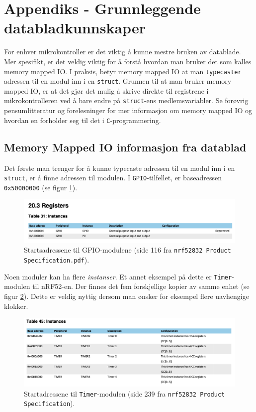 \appendix


\section{Appendiks - Grunnleggende databladkunnskaper}\label{app:datablad}

For enhver mikrokontroller er det viktig å kunne mestre bruken av datablade. Mer spesifikt, er det veldig viktig for å forstå hvordan man bruker det som kalles memory mapped IO. I praksis, betyr memory mapped IO at man \verb|typecaster| adressen til en modul inn i en \verb|struct|. Grunnen til at man bruker memory mapped IO, er at det gjør det mulig å skrive direkte til registrene i mikrokontrolleren ved å bare endre på \verb|struct|-ens medlemsvariabler. Se forøvrig pensumlitteratur og forelesninger for mer informasjon om memory mapped IO og hvordan en forholder seg til det i \verb|C|-programmering.

\subsection{Memory Mapped IO informasjon fra datablad}
Det første man trenger for å kunne typecaste adressen til en modul inn i en \verb|struct|, er å finne adressen til modulen. I \verb|GPIO|-tilfellet, er baseadressen \verb|0x50000000| (se figur \ref{fig:app-gpio-modul}).


\begin{figure}[ht]
    \centering
    \includegraphics[scale=0.5]{Main/figures/gpio_addresse.png}
    \caption{Startsadressene til GPIO-modulene (side 116 fra \texttt{nrf52832 Product Specification.pdf}).}
    \label{fig:app-gpio-modul}
\end{figure}

Noen moduler kan ha flere \textit{instanser}. Et annet eksempel på dette er \verb|Timer|-modulen til nRF52-en. Der finnes det fem forskjellige kopier av samme enhet (se figur \ref{fig:app-timerl}). Dette er veldig nyttig dersom man ønsker for eksempel flere uavhengige klokker.

\begin{figure}[ht]
    \centering
    \includegraphics[scale=0.5]{figures/timer_memory.png}
    \caption{Startadressene til \texttt{Timer}-modulen (side 239 fra \texttt{nrf52832 Product Specification}).}
    \label{fig:app-timerl}
\end{figure}

